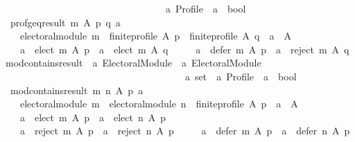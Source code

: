 \begin{isabellebody}
\ \ \ \ \ \ \ \ \ \ \ \ \ \ \ \ \ \ \ \ \ \ \ \ \ \ \ \ \ \ \ \ \ \ {\isacharprime}{\kern0pt}a\ Profile\ {\isasymRightarrow}\ {\isacharprime}{\kern0pt}a\ {\isasymRightarrow}\ bool{\isachardoublequoteclose}\ \isanewline
\ \ {\isachardoublequoteopen}prof{\isacharunderscore}{\kern0pt}geq{\isacharunderscore}{\kern0pt}result\ m\ A\ p\ q\ a\ {\isasymequiv}\isanewline
\ \ \ \ electoral{\isacharunderscore}{\kern0pt}module\ m\ {\isasymand}\ finite{\isacharunderscore}{\kern0pt}profile\ A\ p\ {\isasymand}\ finite{\isacharunderscore}{\kern0pt}profile\ A\ q\ {\isasymand}\ a\ {\isasymin}\ A\ {\isasymand}\isanewline
\ \ \ \ {\isacharparenleft}{\kern0pt}a\ {\isasymin}\ elect\ m\ A\ p\ {\isasymlongrightarrow}\ a\ {\isasymin}\ elect\ m\ A\ q{\isacharparenright}{\kern0pt}\ {\isasymand}\isanewline
\ \ \ \ {\isacharparenleft}{\kern0pt}a\ {\isasymin}\ defer\ m\ A\ p\ {\isasymlongrightarrow}\ a\ {\isasymnotin}\ reject\ m\ A\ q{\isacharparenright}{\kern0pt}{\isachardoublequoteclose}\isanewline
\isanewline
{}\isamarkupfalse%
\ mod{\isacharunderscore}{\kern0pt}contains{\isacharunderscore}{\kern0pt}result\ {\isacharcolon}{\kern0pt}{\isacharcolon}{\kern0pt}\ {\isachardoublequoteopen}{\isacharprime}{\kern0pt}a\ Electoral{\isacharunderscore}{\kern0pt}Module\ {\isasymRightarrow}\ {\isacharprime}{\kern0pt}a\ Electoral{\isacharunderscore}{\kern0pt}Module\ {\isasymRightarrow}\isanewline
\ \ \ \ \ \ \ \ \ \ \ \ \ \ \ \ \ \ \ \ \ \ \ \ \ \ \ \ \ \ \ \ \ \ \ \ \ \ {\isacharprime}{\kern0pt}a\ set\ {\isasymRightarrow}\ {\isacharprime}{\kern0pt}a\ Profile\ {\isasymRightarrow}\ {\isacharprime}{\kern0pt}a\ {\isasymRightarrow}\ bool{\isachardoublequoteclose}\ \isanewline
\ \ {\isachardoublequoteopen}mod{\isacharunderscore}{\kern0pt}contains{\isacharunderscore}{\kern0pt}result\ m\ n\ A\ p\ a\ {\isasymequiv}\isanewline
\ \ \ \ electoral{\isacharunderscore}{\kern0pt}module\ m\ {\isasymand}\ electoral{\isacharunderscore}{\kern0pt}module\ n\ {\isasymand}\ finite{\isacharunderscore}{\kern0pt}profile\ A\ p\ {\isasymand}\ a\ {\isasymin}\ A\ {\isasymand}\isanewline
\ \ \ \ {\isacharparenleft}{\kern0pt}a\ {\isasymin}\ elect\ m\ A\ p\ {\isasymlongrightarrow}\ a\ {\isasymin}\ elect\ n\ A\ p{\isacharparenright}{\kern0pt}\ {\isasymand}\isanewline
\ \ \ \ {\isacharparenleft}{\kern0pt}a\ {\isasymin}\ reject\ m\ A\ p\ {\isasymlongrightarrow}\ a\ {\isasymin}\ reject\ n\ A\ p{\isacharparenright}{\kern0pt}\ {\isasymand}\isanewline
\ \ \ \ {\isacharparenleft}{\kern0pt}a\ {\isasymin}\ defer\ m\ A\ p\ {\isasymlongrightarrow}\ a\ {\isasymin}\ defer\ n\ A\ p{\isacharparenright}{\kern0pt}{\isachardoublequoteclose}%

\end{isabellebody}
